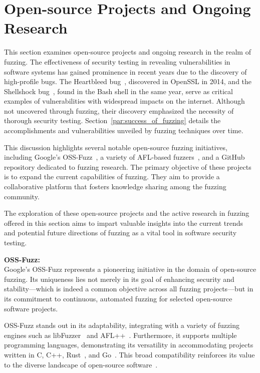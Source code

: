 \section{Open-source Projects and Ongoing Research} This section examines
open-source projects and ongoing research in the realm of fuzzing. The
effectiveness of security testing in revealing vulnerabilities in software
systems has gained prominence in recent years due to the discovery of
high-profile bugs. The Heartbleed bug~\cite{Heartble53:online}, discovered in
OpenSSL in 2014, and the Shellshock bug~\cite{shetty2018shellshock}, found in the
Bash shell in the same year, serve as critical examples of vulnerabilities with
widespread impacts on the internet. Although not uncovered through fuzzing,
their discovery emphasized the necessity of thorough security testing.
Section~\ref{par:success_of_fuzzing} details the accomplishments and
vulnerabilities unveiled by fuzzing techniques over time.

This discussion highlights several notable open-source fuzzing initiatives,
including Google's OSS-Fuzz~\cite{GitHubgo49:online}, a variety of AFL-based
fuzzers~\cite{257204}, and a GitHub repository dedicated to fuzzing research. The
primary objective of these projects is to expand the current capabilities of
fuzzing. They aim to provide a collaborative platform that fosters knowledge
sharing among the fuzzing community.

The exploration of these open-source projects and the active research in
fuzzing offered in this section aims to impart valuable insights into the
current trends and potential future directions of fuzzing as a vital tool in
software security testing.

\textbf{OSS-Fuzz:~\cite{GitHubgo49:online}} \\

Google's OSS-Fuzz represents a pioneering initiative in the domain of open-source fuzzing.
Its uniqueness lies not merely in its goal of enhancing security and stability—which is indeed a
common objective across all fuzzing projects—but in its commitment to continuous,
automated fuzzing for selected open-source software projects.

OSS-Fuzz stands out in its adaptability, integrating with a variety of fuzzing engines such as
libFuzzer~\cite{libFuzze17:online} and AFL++~\cite{257204}.
Furthermore, it supports multiple programming languages, demonstrating its versatility in accommodating
projects written in C, C++, Rust~\cite{klabnik2023rust}, and Go~\cite{donovan2015go}. This broad compatibility reinforces its value to the diverse
landscape of open-source software~\cite{ShortInt96:online}.

